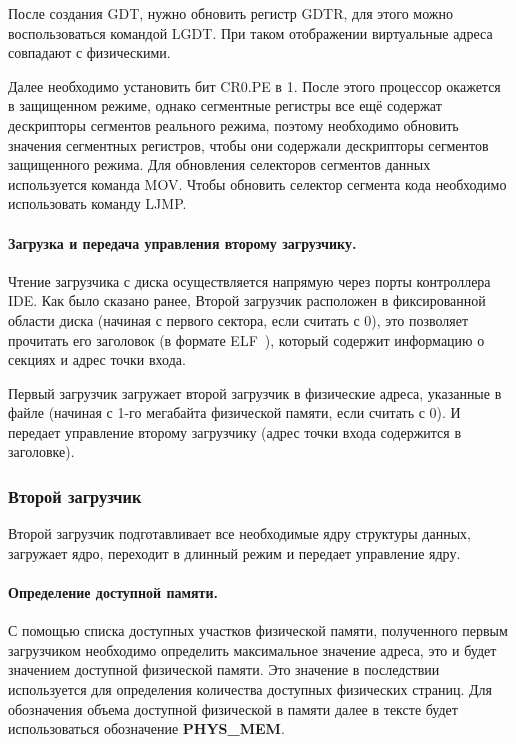 После создания GDT, нужно обновить регистр GDTR, для этого можно воспользоваться командой LGDT.
При таком отображении виртуальные адреса совпадают с физическими.

Далее необходимо установить бит CR0.PE в 1. После этого процессор окажется в защищенном режиме,
однако сегментные регистры все ещё содержат дескрипторы сегментов реального режима, поэтому необходимо
обновить значения сегментных регистров, чтобы они содержали дескрипторы сегментов защищенного
режима. Для обновления селекторов сегментов данных используется команда MOV. Чтобы обновить селектор
сегмента кода необходимо использовать команду LJMP.

\paragraph{Загрузка и передача управления второму загрузчику.} Чтение загрузчика с диска
осуществляется напрямую через порты контроллера IDE. Как было сказано ранее, Второй загрузчик
расположен в фиксированной области диска (начиная с первого сектора, если считать с 0), это
позволяет прочитать его заголовок (в формате ELF~\cite{elf}), который содержит информацию о
секциях и адрес точки входа.

Первый загрузчик загружает второй загрузчик в физические адреса, указанные в файле
(начиная с 1-го мегабайта физической памяти, если считать с 0). И передает управление
второму загрузчику (адрес точки входа содержится в заголовке).


\subsubsection*{Второй загрузчик}
Второй загрузчик подготавливает все необходимые ядру структуры данных, загружает ядро,
переходит в длинный режим и передает управление ядру.

\paragraph{Определение доступной памяти.} С помощью списка доступных участков физической
памяти, полученного первым загрузчиком необходимо определить максимальное значение адреса,
это и будет значением доступной физической памяти. Это значение в последствии используется
для определения количества доступных физических страниц. Для обозначения объема доступной
физической в памяти далее в тексте будет использоваться обозначение \textbf{PHYS\_MEM}.

